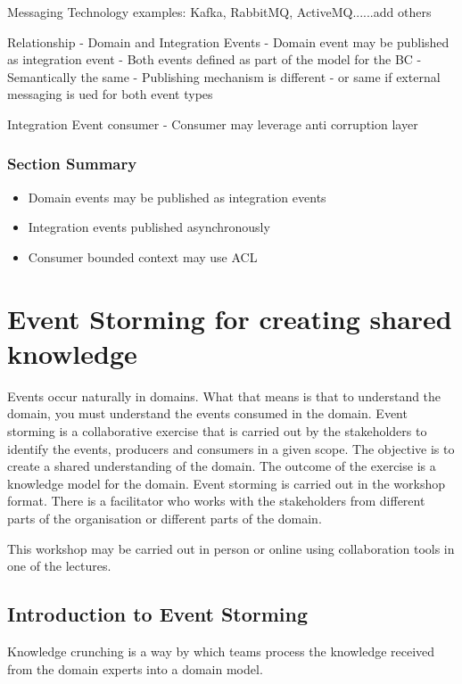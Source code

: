 \documentclass[a4paper, 11pt]{book}
\begin{document}
    Messaging Technology examples: Kafka, RabbitMQ, ActiveMQ......add others

    Relationship - Domain and Integration Events
    - Domain event may be published as integration event
    - Both events defined as part of the model for the BC
    - Semantically the same
    - Publishing mechanism is different - or same if external messaging is ued for both event types

    Integration Event consumer
    - Consumer may leverage anti corruption layer

    \subsection{Section Summary}
    \begin{itemize}
        \item Domain events may be published as integration events
        \item Integration events published asynchronously
        \item Consumer bounded context may use ACL
    \end{itemize}


    \chapter{Event Storming for creating shared knowledge}

    Events occur naturally in domains.
    What that means is that to understand the domain, you must understand the events consumed in the domain.
    Event storming is a collaborative exercise that is carried out by the stakeholders to identify the events, producers and consumers in a given scope.
    The objective is to create a shared understanding of the domain.
    The outcome of the exercise is a knowledge model for the domain.
    Event storming is carried out in the workshop format.
    There is a facilitator who works with the stakeholders from different parts of the organisation or different parts of the domain.

    This workshop may be carried out in person or online using collaboration tools in one of the lectures.


    \section{Introduction to Event Storming}

    Knowledge crunching is a way by which teams process the knowledge received from the domain experts into a domain model.
\end{document}
